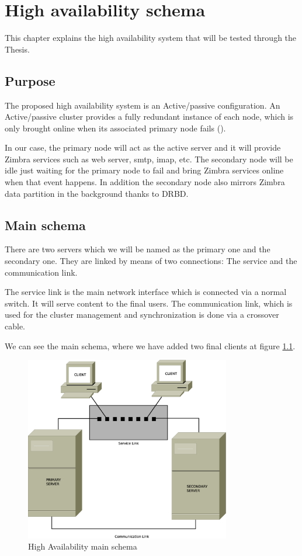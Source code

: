 

\chapter{High availability schema}
\label{chap:ha-schema}
This chapter explains the high availability system that will be tested through the Thesis. 

\section {Purpose}
The proposed high availability system is an Active/passive configuration. An Active/passive cluster provides a fully redundant instance of each node, which is only brought online when its associated primary node fails (\cite{HAClusterNodeConfigurations}).

In our case, the primary node will act as the active server and it will provide Zimbra services such as web server, smtp, imap, etc. The secondary node will be idle just waiting for the primary node to fail and bring Zimbra services online when that event happens. In addition the secondary node also mirrors Zimbra data partition in the background thanks to DRBD.

\section {Main schema}
There are two servers which we will be named as the primary one and the secondary one. They are linked by means of two connections: The service and the communication link.

The service link is the main network interface which is connected via a normal switch. It will serve content to the final users. The communication link, which is used for the cluster management and synchronization is done via a crossover cable.

We can see the main schema, where we have added two final clients at figure \ref{fig:main-schema}.

\begin{figure}
  \centering
    \includegraphics[width=0.8\textwidth]{img/ha_main_schema.eps}
  \caption{High Availability main schema}
  \label{fig:main-schema}
\end{figure}

